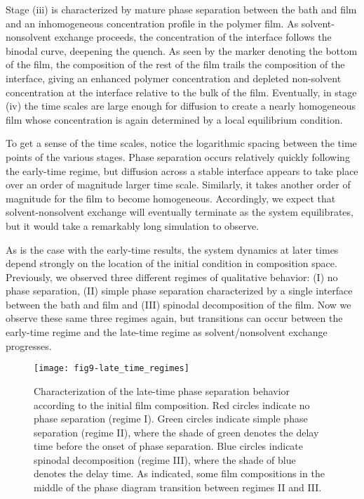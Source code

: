 \documentclass[journal=mamobx, layout=twocolumn]{achemso}
\begin{document}
Stage (iii) is characterized by mature phase separation between the bath and film and an inhomogeneous concentration profile in the polymer film.
As solvent-nonsolvent exchange proceeds, the concentration of the interface follows the binodal curve, deepening the quench.
As seen by the marker denoting the bottom of the film, the composition of the rest of the film trails the composition of the interface, giving an enhanced polymer concentration and depleted non-solvent concentration at the interface relative to the bulk of the film.
Eventually, in stage (iv) the time scales are large enough for diffusion to create a nearly homogeneous film whose concentration is again determined by a local equilibrium condition.

To get a sense of the time scales, notice the logarithmic spacing between the time points of the various stages.
Phase separation occurs relatively quickly following the early-time regime, but diffusion across a stable interface appears to take place over an order of magnitude larger time scale.
Similarly, it takes another order of magnitude for the film to become homogeneous.
Accordingly, we expect that solvent-nonsolvent exchange will eventually terminate as the system equilibrates, but it would take a remarkably long simulation to observe.

As is the case with the early-time results, the system dynamics at later times depend strongly on the location of the initial condition in composition space. 
Previously, we observed three different regimes of qualitative behavior: (I) no phase separation, (II) simple phase separation  characterized by a single interface between the bath and film and (III) spinodal decomposition of the film.
Now we observe these same three regimes again, but transitions can occur between the early-time regime and the late-time regime as solvent/nonsolvent exchange progresses.

\begin{figure}[tbp]
  \texttt{[image: fig9-late\_time\_regimes]}
  \caption{%
Characterization of the late-time phase separation behavior according to the initial film composition.
Red circles indicate no phase separation (regime I).
Green circles indicate simple phase separation (regime II), where the shade of green denotes the delay time before the onset of phase separation.
Blue circles indicate spinodal decomposition (regime III), where the shade of blue denotes the delay time.
As indicated, some film compositions in the middle of the phase diagram transition between regimes II and III.
}
  \label{fig-late_time_regimes}
\end{figure}
\end{document}
